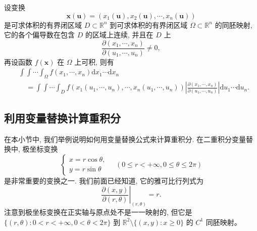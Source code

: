 \documentclass[12pt,fontset=fandol]{ctexart}
\begin{document}
\begin{theorem}\label{course-theorem-15-4-3}\quad 设变换
\[
  \boldsymbol x(\boldsymbol u)=(x_1(\boldsymbol u),x_2(\boldsymbol u),\cdots,x_n(\boldsymbol u))
\]
是可求体积的有界闭区域 $D\subset\mathbb R^n$ 到可求体积的有界闭区域 $\Omega\subset\mathbb R^n$ 的同胚映射, 它的各个偏导数在包含 $D$ 的区域上连续, 并且在 $D$ 上
\[
  \frac{\partial(x_1,\cdots,x_n)}{\partial(u_1,\cdots,u_n)}\ne0,
\]
再设函数 $f(\boldsymbol x)$ 在 $\Omega$ 上可积, 则有
\[
\begin{aligned}
  &\int\!\!\int\cdots\int_\Omega f(x_1,\cdots,x_n)\mathrm dx_1\cdots\mathrm dx_n\\
  &\quad=\int\!\!\int\cdots\int_D
  f(x_1(u_1,\cdots,u_n),\cdots,x_n(u_1,\cdots,u_n))
  \left|\frac{\partial(x_1,\cdots,x_n)}{\partial(u_1,\cdots,u_n)}\right|
  \mathrm du_1\cdots\mathrm du_n.
\end{aligned}
\]

\end{theorem}
\subsection{利用变量替换计算重积分}

在本小节中, 我们举例说明如何用变量替换公式来计算重积分. 在二重积分变量替换中, 极坐标变换
\[
  \begin{cases}
    x=r\cos\theta,\\
    y=r\sin\theta
  \end{cases}
  \quad(0\leqslant r<+\infty,0\leqslant\theta\leqslant2\pi)
\]
是非常重要的变换之一. 我们前面已经知道, 它的雅可比行列式为
\[
  \left.\frac{\partial(x,y)}{\partial(r,\theta)}\right|_{(r,\theta)}=r.
\]
注意到极坐标变换在正实轴与原点处不是一一映射的, 但它是 $\{(r,\theta):0<r<+\infty,0<\theta<2\pi\}$ 到 $\mathbb R^2\setminus\{(x,y):x\geqslant0\}$ 的 $C^1$ 同胚映射。
\end{document}
